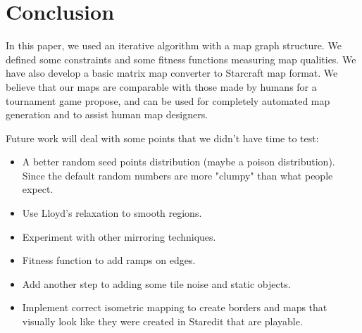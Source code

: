 \documentclass[letterpaper]{article}
\begin{document}


\section{Conclusion} %
\label{sec:conclusion}
In this paper, we used an iterative algorithm with a map graph structure. We defined some constraints and some ﬁtness functions measuring map qualities. We have also develop a basic matrix map converter to Starcraft map format. We believe that our maps are comparable with those made by humans for a tournament game propose, and can be used for completely automated map generation and to assist human map designers.

Future work will deal with some points that we didn't have time to test:
\begin{itemize}
	\item A better random seed points distribution (maybe a poison distribution). Since the default random numbers are more "clumpy" than what people expect.
	\item Use Lloyd's relaxation to smooth regions.
	\item Experiment with other mirroring techniques.
	\item Fitness function to add ramps on edges.
	\item Add another step to adding some tile noise and static objects.
	\item Implement correct isometric mapping to create borders and maps that visually look like they were created in Staredit that are playable.
\end{itemize}





\end{document}
